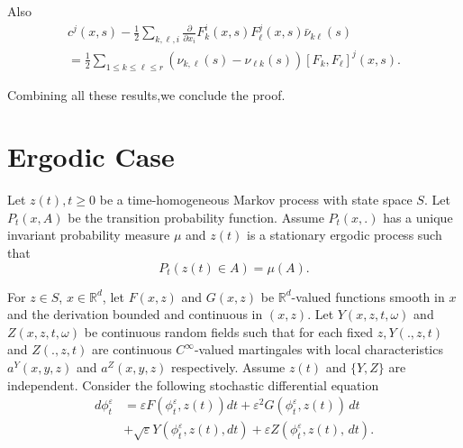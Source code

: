 Also
\begin{multline*}
c^j (x,s) -\frac{1}{2} \sum_{k,\ell,i} \frac{\partial}{\partial x_i}
F^i_k(x,s) F^j_\ell (x,s) \bar{\nu}_{k \ell}(s) \\
   = \frac{1}{2} \sum_{1 \le k \le \ell \le r} (\nu_{k,\ell}(s) -
   \nu_{\ell k}(s)) [F_k, F_\ell]^j (x,s). \tag{3.8.6}\label{c3:eq3.8.6} 
\end{multline*}
 
Combining all these results,we conclude the proof.




\section{Ergodic Case}\label{chap3:sec3.9}

Let $z (t), t \ge 0$ be a time-homogeneous Markov process with state
space $S$. Let $P_t (x,A)$ be the transition probability
function. Assume $P_t(x,.)$ has a unique invariant probability measure
$\mu$ and $z(t)$ is a stationary ergodic process such that 
$$
P_t(z(t)\in A)=\mu (A).
$$\pageoriginale

For $z \in S$, $x \in \mathbb{R}^d$, let $F(x,z)$ and $G(x,z)$ be
$\mathbb{R}^d$-valued functions smooth in $x$ and the derivation
bounded and continuous in $(x,z)$. Let $Y(x,z,t, \omega)$ and
$Z(x,z,t,\omega)$ be continuous random fields such that for each fixed
$z,Y(.,z,t)$ and $Z(.,z,t)$ are continuous $C^ \infty$-valued
martingales with local 
characteristics $a^Y(x,y,z)$ and $a^Z(x,y,z)$ respectively. Assume
$z(t)$ and $\{ Y,Z \}$ are independent. Consider the following
stochastic differential equation 
\begin{align*}
  d \phi^\varepsilon_t & = \varepsilon F(\phi^\varepsilon_t, z (t))dt
  + \varepsilon^2 G (\phi^\varepsilon_t, z(t)) \, dt\\ 
 & + \sqrt{\varepsilon} Y(\phi^\varepsilon_t, z (t), dt) + \varepsilon
  Z (\phi^\varepsilon_t, z(t), \, dt).  \tag{3.9.1}\label{c3:eq3.9.1} 
\end{align*}

